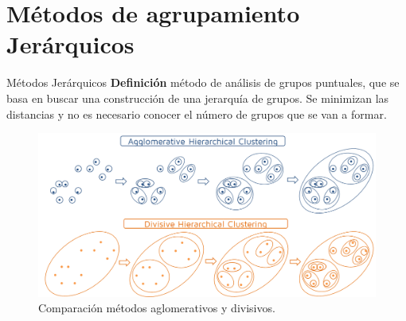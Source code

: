 \documentclass[spanish]{beamer}
\begin{document}
\section{Métodos de agrupamiento\\ Jerárquicos}
\begin{frame}{Métodos Jerárquicos}
	\centering
	\textbf{Definición} método de análisis de grupos puntuales, que se basa en buscar una construcción de una jerarquía de grupos. Se minimizan las distancias y no es necesario conocer el número de grupos que se van a formar.\\
	\begin{figure}[H]
		\centering
		\includegraphics[scale=0.15]{victoria/compAglomeDivisivo}
		\caption{Comparación métodos aglomerativos y divisivos.}
		\label{fig:agl_div}
	\end{figure}
\end{frame}
\end{document}
